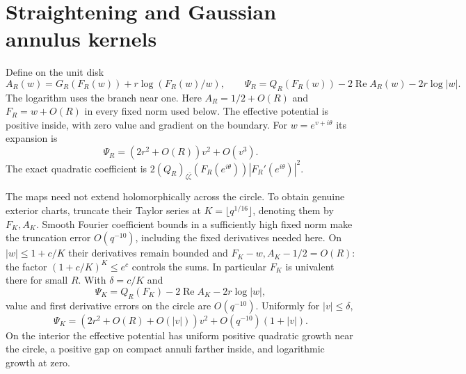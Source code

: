 \documentclass[11pt]{article}
\theoremstyle{remark}\newtheorem{remark}[theorem]{Remark}
\DeclareMathOperator{\Rea}{Re}
\begin{document}
\section{Straightening and Gaussian annulus kernels}
Define on the unit disk
\[
 A_R(w)=G_R(F_R(w))+r\log(F_R(w)/w),\qquad
 \Psi_R=Q_R(F_R(w))-2\Rea A_R(w)-2r\log|w|.
\]
The logarithm uses the branch near one. Here $A_R=1/2+O(R)$ and
$F_R=w+O(R)$ in every fixed norm used below. The effective potential is
positive inside, with zero value and gradient on the boundary. For
$w=e^{v+i\theta}$ its expansion is
\begin{equation}\label{eq:ring}
 \Psi_R=(2r^2+O(R))v^2+O(v^3).
\end{equation}
The exact quadratic coefficient is
$2(Q_R)_{\zeta\bar\zeta}(F_R(e^{i\theta}))|F_R'(e^{i\theta})|^2$.

The maps need not extend holomorphically across the circle. To obtain
genuine exterior charts, truncate their Taylor series at
$K=\lfloor q^{1/16}\rfloor$, denoting them by $F_K,A_K$.
Smooth Fourier coefficient bounds in a sufficiently high fixed norm
make the truncation error $O(q^{-10})$, including the fixed derivatives
needed here. On $|w|\leq1+c/K$ their derivatives remain bounded and
$F_K-w,A_K-1/2=O(R)$: the factor $(1+c/K)^K\leq e^c$ controls the sums.
In particular $F_K$ is univalent there for small $R$. With
$\delta=c/K$ and
\[
 \Psi_K=Q_R(F_K)-2\Rea A_K-2r\log|w|,
\]
value and first derivative errors on the circle are $O(q^{-10})$.
Uniformly for $|v|\leq\delta$,
\begin{equation}\label{eq:ringK}
 \Psi_K=(2r^2+O(R)+O(|v|))v^2+O(q^{-10})(1+|v|).
\end{equation}
On the interior the effective potential has uniform positive quadratic
growth near the circle, a positive gap on compact annuli farther inside,
and logarithmic growth at zero.
\end{document}
